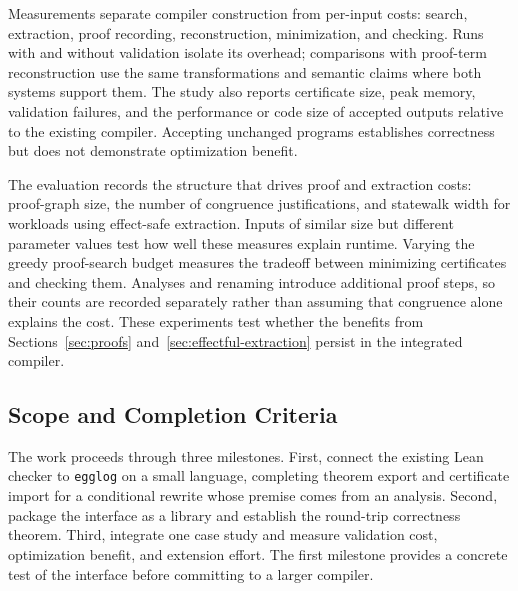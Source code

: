 Measurements separate compiler construction from per-input costs:
  search, extraction, proof recording, reconstruction, minimization, and checking.
Runs with and without validation isolate its overhead;
  comparisons with proof-term reconstruction use the same transformations and semantic claims
  where both systems support them.
The study also reports certificate size, peak memory, validation failures,
  and the performance or code size of accepted outputs relative to the existing compiler.
Accepting unchanged programs establishes correctness but does not demonstrate optimization benefit.

The evaluation records the structure that drives proof and extraction costs:
  proof-graph size, the number of congruence justifications, and statewalk width
  for workloads using effect-safe extraction.
Inputs of similar size but different parameter values test how well these measures explain runtime.
Varying the greedy proof-search budget measures the tradeoff between minimizing certificates
  and checking them.
Analyses and renaming introduce additional proof steps,
  so their counts are recorded separately rather than assuming that congruence alone explains the cost.
These experiments test whether the benefits from Sections~\ref{sec:proofs} and~\ref{sec:effectful-extraction}
  persist in the integrated compiler.

\subsection{Scope and Completion Criteria}
\label{sec:contexts}

The work proceeds through three milestones.
First, connect the existing Lean checker to \texttt{egglog} on a small language,
  completing theorem export and certificate import for a conditional rewrite whose premise comes from an analysis.
Second, package the interface as a library and establish the round-trip correctness theorem.
Third, integrate one case study and measure validation cost, optimization benefit, and extension effort.
The first milestone provides a concrete test of the interface before committing to a larger compiler.

